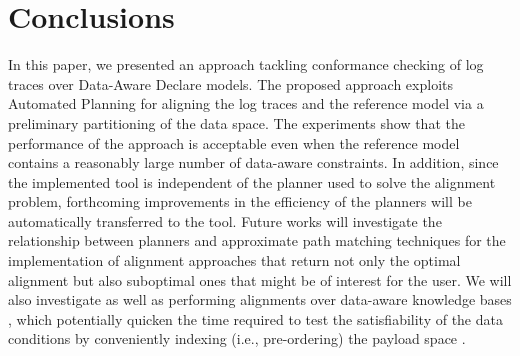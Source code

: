 \section{Conclusions}\label{sec:end}
In this paper, we presented an approach tackling conformance checking of log traces over Data-Aware Declare models. The proposed approach exploits Automated Planning for aligning the log traces and the reference model via a preliminary partitioning of the data space. The experiments show that the performance of the approach is acceptable even when the reference model contains a reasonably large number of data-aware constraints. In addition, since the implemented tool is independent of the planner used to solve the alignment problem, forthcoming improvements in the efficiency of the planners will be automatically transferred to the tool.
%
Future works will investigate the relationship between planners and approximate path matching techniques \cite{Myers1989} for the implementation of alignment approaches that return not only the optimal alignment but also suboptimal ones that might be of interest for the user. We will also investigate  as well as performing alignments over data-aware knowledge bases \cite{10.1007/978-3-319-39696-5_18}, which potentially quicken the time required to test the satisfiability of the data conditions by conveniently indexing (i.e., pre-ordering) the payload space \cite{IdreosGNMMK12}. 